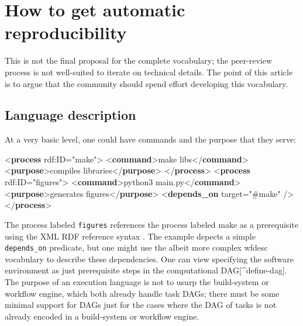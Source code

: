 \documentclass[manuscript,authordraft]{acmart}
\newenvironment{Shaded}{}{}
\newcommand{\KeywordTok}[1]{\textcolor[rgb]{0.00,0.44,0.13}{\textbf{#1}}}
\newcommand{\NormalTok}[1]{#1}
\newcommand{\OtherTok}[1]{\textcolor[rgb]{0.00,0.44,0.13}{#1}}
\newcommand{\StringTok}[1]{\textcolor[rgb]{0.25,0.44,0.63}{#1}}
\begin{document}
\hypertarget{how-to-get-automatic-reproducibility}{%
\section{How to get automatic
reproducibility}\label{how-to-get-automatic-reproducibility}}

This is not the final proposal for the complete vocabulary; the
peer-review process is not well-suited to iterate on technical details.
The point of this article is to argue that the community should spend
effort developing this vocabulary.

\hypertarget{language-description}{%
\subsection{Language description}\label{language-description}}

At a very basic level, one could have commands and the purpose that they
serve:

\small

\begin{Shaded}
\begin{Highlighting}[]
\NormalTok{\textless{}}\KeywordTok{process}\OtherTok{ rdf:ID=}\StringTok{"make"}\NormalTok{\textgreater{}}
\NormalTok{  \textless{}}\KeywordTok{command}\NormalTok{\textgreater{}make libs\textless{}/}\KeywordTok{command}\NormalTok{\textgreater{}}
\NormalTok{  \textless{}}\KeywordTok{purpose}\NormalTok{\textgreater{}compiles libraries\textless{}/}\KeywordTok{purpose}\NormalTok{\textgreater{}}
\NormalTok{\textless{}/}\KeywordTok{process}\NormalTok{\textgreater{}}
\NormalTok{\textless{}}\KeywordTok{process}\OtherTok{ rdf:ID=}\StringTok{"figures"}\NormalTok{\textgreater{}}
\NormalTok{  \textless{}}\KeywordTok{command}\NormalTok{\textgreater{}python3 main.py\textless{}/}\KeywordTok{command}\NormalTok{\textgreater{}}
\NormalTok{  \textless{}}\KeywordTok{purpose}\NormalTok{\textgreater{}generates figures\textless{}/}\KeywordTok{purpose}\NormalTok{\textgreater{}}
\NormalTok{  \textless{}}\KeywordTok{depends\_on}\OtherTok{ target=}\StringTok{"\#make"}\NormalTok{ /\textgreater{}}
\NormalTok{\textless{}/}\KeywordTok{process}\NormalTok{\textgreater{}}
\end{Highlighting}
\end{Shaded}

\normalsize

The process labeled \texttt{figures} references the process labeled make
as a prerequisite using the XML RDF reference syntax
\cite{gandon_rdf_2014}. The example depects a simple
\texttt{depends\_on} predicate, but one might use the albeit more
complex wfdesc vocabulary \cite{soiland-reyes_wf4ever_2013} to describe
these dependencies. One can view specifying the software environment as
just prerequisite steps in the computational DAG{[}\^{}define-dag{]}.
The purpose of an execution language is not to usurp the build-system or
workflow engine, which both already handle task DAGs; there must be some
minimal support for DAGs just for the cases where the DAG of tasks is
not already encoded in a build-system or workflow engine.
\end{document}
